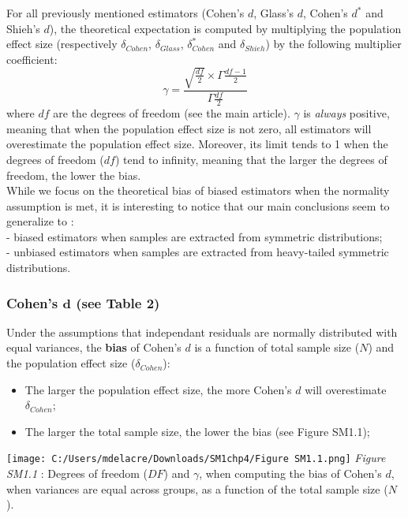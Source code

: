\documentclass[
  english,
  man,mask,floatsintext]{apa6}
\begin{document}
For all previously mentioned estimators (Cohen's \(d\), Glass's \(d\), Cohen's \(d^*\) and Shieh's \(d\)), the theoretical expectation is computed by multiplying the population effect size (respectively \(\delta_{Cohen}\), \(\delta_{Glass}\), \(\delta^*_{Cohen}\) and \(\delta_{Shieh}\)) by the following multiplier coefficient:
\begin{equation} 
\gamma=\frac{\sqrt{\frac{df}{2}} \times \Gamma{\frac{df-1}{2}}}{\Gamma{\frac{df}{2}}}
\label{eq:mc}
\end{equation}
where \(df\) are the degrees of freedom (see the main article). \(\gamma\) is \emph{always} positive, meaning that when the population effect size is not zero, all estimators will overestimate the population effect size. Moreover, its limit tends to 1 when the degrees of freedom (\(df\)) tend to infinity, meaning that the larger the degrees of freedom, the lower the bias.\\
While we focus on the theoretical bias of biased estimators when the normality assumption is met, it is interesting to notice that our main conclusions seem to generalize to :\\
- biased estimators when samples are extracted from symmetric distributions;\\
- unbiased estimators when samples are extracted from heavy-tailed symmetric distributions.

\hypertarget{cohens-bmd-see-table-2}{%
\subsubsection{\texorpdfstring{Cohen's \(\bm{d}\) (see Table 2)}{Cohen's \textbackslash bm\{d\} (see Table 2)}}\label{cohens-bmd-see-table-2}}

Under the assumptions that independant residuals are normally distributed with equal variances, the \textbf{bias} of Cohen's \(d\) is a function of total sample size (\(N\)) and the population effect size (\(\delta_{Cohen}\)):

\begin{itemize}
\item
  The larger the population effect size, the more Cohen's \(d\) will overestimate \(\delta_{Cohen}\);
\item
  The larger the total sample size, the lower the bias (see Figure SM1.1);
\end{itemize}

\texttt{[image: C:/Users/mdelacre/Downloads/SM1chp4/Figure SM1.1.png]}
\emph{Figure SM1.1} : Degrees of freedom (\(DF\)) and \(\gamma\), when computing the bias of Cohen's \(d\), when variances are equal across groups, as a function of the total sample size (\(N\)).
\end{document}
